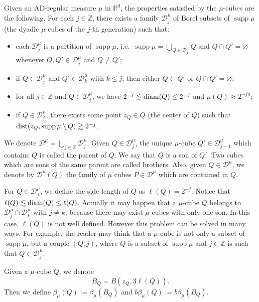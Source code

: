 \documentclass[11pt]{amsart}
\newcommand{\R}{{\mathbb R}}       %
\newcommand{\Z}{{\mathbb Z}}       %
\newcommand{\DD}{{\mathcal D}}
\newcommand{\diam}{{\rm diam}}
\newcommand{\dist}{{\rm dist}}
\newcommand{\supp}{\operatorname{supp}}
\theoremstyle{definition}
\theoremstyle{remark}
\numberwithin{equation}{section}
\begin{document}
Given an AD-regular measure $\mu$ in $\R^d$, the properties satisfied by the $\mu$-cubes are
the following. 
For each $j\in\Z$, there exists a family $\DD_j^\mu$ of Borel subsets of $\supp\mu$ (the dyadic $\mu$-cubes of the $j$-th
 generation) such that:
\begin{itemize}
\item[(i)] each $\DD_j^\mu$ is a partition of $\supp\mu$, i.e.\ $\supp\mu=\bigcup_{Q\in \DD_j^\mu} Q$ and $Q\cap Q'=\varnothing$ whenever $Q,Q'\in\DD_j^\mu$ and
$Q\neq Q'$;
\item[(ii)] if $Q\in\DD_j^\mu$ and $Q'\in\DD_k^\mu$ with $k\leq j$, then either $Q\subset Q'$ or $Q\cap Q'=\varnothing$;
\item[(iii)] for all $j\in\Z$ and $Q\in\DD_j^\mu$, we have $2^{-j}\lesssim\diam(Q)\leq2^{-j}$ and $\mu(Q)\approx 2^{-jn}$;
\item[(iv)] if $Q\in\DD_j^\mu$, there exists some point $z_Q\in Q$ (the center of $Q$) such that $\dist(z_Q,\supp\mu\setminus Q)
\gtrsim 2^{-j}$.
\end{itemize}
We denote $\DD^\mu=\bigcup_{j\in\Z}\DD^\mu_j$. Given $Q\in\DD^\mu_j$, the unique $\mu$-cube $Q'\in\DD_{j-1}^\mu$ which contains $Q$ is called the parent of $Q$.
We say that $Q$ is a son of $Q'$. Two cubes which are sons of the same parent are called brothers.
Also, given $Q\in\DD^\mu$, we denote by $\DD^\mu(Q)$ the family of
$\mu$ cubes $P\in\DD^\mu$ which are contained in $Q$. 

For $Q\in \DD_j^\mu$, we define the side length
 of $Q$ as $\ell(Q)=2^{-j}$. Notice that $\ell(Q)\lesssim\diam(Q)\leq \ell(Q)$.
Actually it may happen that a $\mu$-cube $Q$ belongs to $\DD_ j^\mu\cap \DD_k^\mu$ with $j\neq k$, because there may exist $\mu$-cubes
with only one son. In this case, $\ell(Q)$ is not well defined. However this problem can be solved in many ways.
For example, the reader may think that a $\mu$-cube is not only a subset of $\supp\mu$, but a couple $(Q,j)$, where $Q$ is
a subset of $\supp\mu$ and $j\in\Z$ is such that $Q\in\DD_j^\mu$.



Given a $\mu$-cube $Q$, we denote  
$$B_Q=B(z_Q,3\ell(Q)).$$
 Then we define
 $\beta_\mu(Q):=\beta_\mu(B_Q)$ and $b\beta_\mu(Q):=b\beta_\mu(B_Q)$.
\end{document}
